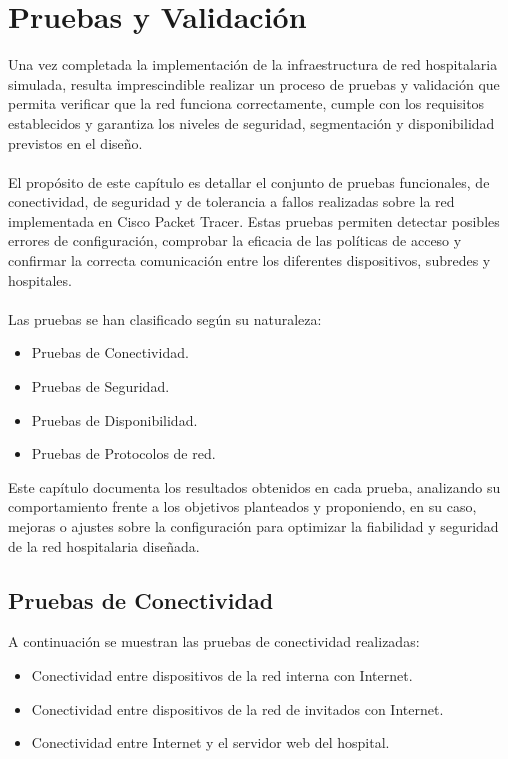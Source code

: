 
\chapter{Pruebas y Validación}\label{pruebas}
Una vez completada la implementación de la infraestructura de red hospitalaria simulada, resulta imprescindible realizar un proceso de pruebas y validación que permita 
verificar que la red funciona correctamente, cumple con los requisitos establecidos y garantiza los niveles de seguridad, segmentación y disponibilidad previstos en el diseño.
\\ \\ 
El propósito de este capítulo es detallar el conjunto de pruebas funcionales, de conectividad, de seguridad y de tolerancia a fallos realizadas sobre la red implementada en 
Cisco Packet Tracer. Estas pruebas permiten detectar posibles errores de configuración, comprobar la eficacia de las políticas de acceso y confirmar la correcta comunicación 
entre los diferentes dispositivos, subredes y hospitales.
\\ \\ 
Las pruebas se han clasificado según su naturaleza:
\begin{itemize}
    \item Pruebas de Conectividad.
    \item Pruebas de Seguridad.
    \item Pruebas de Disponibilidad.
    \item Pruebas de Protocolos de red.
\end{itemize}

Este capítulo documenta los resultados obtenidos en cada prueba, analizando su comportamiento frente a los objetivos planteados y proponiendo, en su caso, mejoras o ajustes sobre 
la configuración para optimizar la fiabilidad y seguridad de la red hospitalaria diseñada.

\section{Pruebas de Conectividad}
A continuación se muestran las pruebas de conectividad realizadas:
\begin{itemize}
    \item Conectividad entre dispositivos de la red interna con Internet.
    \item Conectividad entre dispositivos de la red de invitados con Internet.
    \item Conectividad entre Internet y el servidor web del hospital.
\end{itemize}

